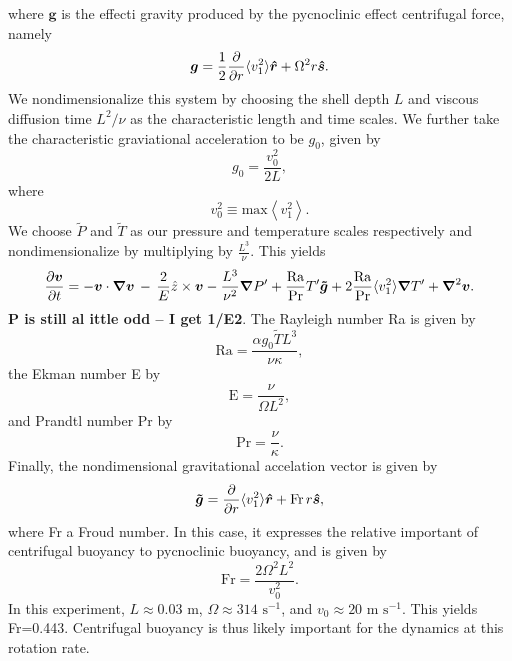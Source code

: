 where $\boldsymbol{g}$ is the effecti gravity produced by the pycnoclinic effect centrifugal force, namely
\begin{equation}
\boldsymbol{g} = \frac{1}{2}\frac{\partial}{\partial r}\langle v_1^2\rangle\boldsymbol{\hat{r}} + \Omega^2 r\boldsymbol{\boldsymbol{\hat{s}}}  .
\end{equation}
We nondimensionalize this system by choosing the shell depth $L$ and viscous diffusion time $L^2/\nu$ as the characteristic length and time scales.   We further take the characteristic graviational acceleration to be $g_0$, given by
\begin{equation}
g_0 = \frac{v_0^2}{2 L},
\end{equation}
where 
\begin{equation}
v_0^2 \equiv \mathrm{max}\left\langle v_1^2 \right\rangle.
\end{equation}
We choose $\tilde{P}$ and $\tilde{T}$ as our pressure and temperature scales respectively and
nondimensionalize by multiplying by $\frac{L^3}{\nu}$.  This yields
\begin{equation}
\frac{ \partial \vvec }{\partial t}   =  - \vvec\cdot\boldsymbol{\nabla}\vvec
\,-\, \frac{2}{E}{\hat{z}}\times\vvec  
-\frac{L^3}{\nu^2}\boldsymbol{\nabla}P'  %
						        + \frac{\mathrm{Ra}}{\mathrm{Pr}} T' \boldsymbol{\tilde{g}}
							+2\frac{\mathrm{Ra}}{\mathrm{Pr}}\langle v_1^2\rangle\boldsymbol{\nabla} T'
+ \boldsymbol{\nabla}^2\vvec.
\end{equation}
{\bf P is still al ittle odd -- I get 1/E2}.
The Rayleigh number Ra is given by
\begin{equation}
\mathrm{Ra} = \frac{\alpha g_0 \tilde{T} L^3}{\nu\kappa},
\end{equation}
the Ekman number E by
\begin{equation}
\mathrm{E} = \frac{\nu}{\Omega L^2},
\end{equation}
and Prandtl number Pr by
\begin{equation}
\mathrm{Pr} = \frac{\nu}{\kappa}.
\end{equation}
Finally, the nondimensional gravitational accelation vector is given by
\begin{equation}
\boldsymbol{\tilde{g}} = \frac{\partial}{\partial r}\langle v_1^2\rangle\boldsymbol{\hat{r}} + \mathrm{Fr}\, r\boldsymbol{\boldsymbol{\hat{s}}},
\end{equation}
where Fr a Froud number.  In this case, it expresses the relative important of centrifugal buoyancy to pycnoclinic buoyancy, and is given by
\begin{equation}
\mathrm{Fr} = \frac{2\Omega^2 L^2}{v_0^2}.
\end{equation} 
In this experiment, $L \approx 0.03$ m, $\Omega \approx 314 \,\,\mathrm{ s}^{-1}$, and $v_0 \approx 20 \,\,\mathrm{m}\,\,\mathrm{s}^{-1}$.  This yields Fr=0.443.  Centrifugal buoyancy is thus likely important for the dynamics at this rotation rate.
\clearpage



